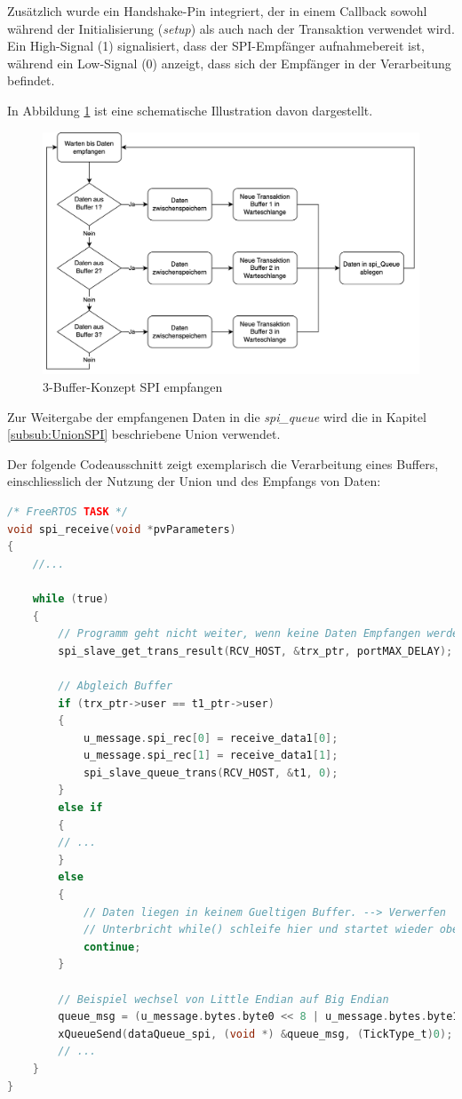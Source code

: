 Zusätzlich wurde ein Handshake-Pin integriert, der in einem Callback sowohl während der Initialisierung (\textit{setup}) als auch nach der Transaktion verwendet wird. Ein High-Signal (1) signalisiert, dass der SPI-Empfänger aufnahmebereit ist, während ein Low-Signal (0) anzeigt, dass sich der Empfänger in der Verarbeitung befindet.

In Abbildung \ref{fig:3BuffKonz} ist eine schematische Illustration davon dargestellt. 

\begin{figure}[H]
    \centering
    \includegraphics[width=0.75\linewidth]{Figures/Chap3/ESP/SPI_RECEIVE/Bufferkonzept_BLE.png}
    \caption{3-Buffer-Konzept SPI empfangen}
    \label{fig:3BuffKonz}
\end{figure}

Zur Weitergabe der empfangenen Daten in die \textit{spi\_queue} wird die in Kapitel \ref{subsub:UnionSPI} beschriebene Union verwendet.

Der folgende Codeausschnitt zeigt exemplarisch die Verarbeitung eines Buffers, einschliesslich der Nutzung der Union und des Empfangs von Daten:

\begin{lstlisting}[language=C]
/* FreeRTOS TASK */
void spi_receive(void *pvParameters)
{
    //...
    
    while (true)
    {
        // Programm geht nicht weiter, wenn keine Daten Empfangen werden.
        spi_slave_get_trans_result(RCV_HOST, &trx_ptr, portMAX_DELAY);

        // Abgleich Buffer
        if (trx_ptr->user == t1_ptr->user)
        {
            u_message.spi_rec[0] = receive_data1[0];
            u_message.spi_rec[1] = receive_data1[1];
            spi_slave_queue_trans(RCV_HOST, &t1, 0);
        } 
        else if
        {
        // ...
        }
        else
        {
            // Daten liegen in keinem Gueltigen Buffer. --> Verwerfen
            // Unterbricht while() schleife hier und startet wieder oben
            continue;
        }
        
        // Beispiel wechsel von Little Endian auf Big Endian
        queue_msg = (u_message.bytes.byte0 << 8 | u_message.bytes.byte1);
        xQueueSend(dataQueue_spi, (void *) &queue_msg, (TickType_t)0);
        // ...
    }
}
        
\end{lstlisting}


